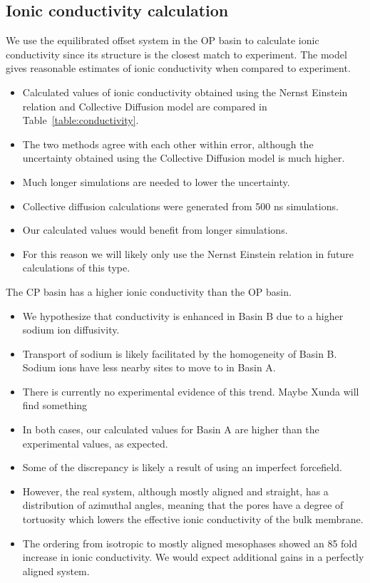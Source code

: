 \documentclass{article}
\begin{document}
  \subsection*{Ionic conductivity calculation}

  We use the equilibrated offset system in the OP basin to calculate ionic 
  conductivity since its structure is the closest match to experiment.
  The model gives reasonable estimates of ionic conductivity when compared to 
  experiment.
  \begin{itemize}
  	\item Calculated values of ionic conductivity obtained using the Nernst 
	Einstein relation and Collective Diffusion model are compared in 
	Table~\ref{table:conductivity}.
	\item The two methods agree with each other within error, although the 
	uncertainty obtained using the Collective Diffusion model is much higher.
	\item Much longer simulations are needed to lower the uncertainty. %
	\item Collective diffusion calculations were generated from 
	500 ns simulations.
	\item Our calculated values would benefit from longer simulations. 
	\item For this reason we will likely only use the Nernst Einstein relation
	in future calculations of this type. 
  \end{itemize}

  The CP basin has a higher ionic conductivity than the OP basin.
  \begin{itemize}
	\item We hypothesize that conductivity is enhanced in Basin B due to a 
	higher sodium ion diffusivity.
	\item Transport of sodium is likely facilitated by the homogeneity of Basin B.
	Sodium ions have less nearby sites to move to in Basin A.
	\item There is currently no experimental evidence of this trend. Maybe Xunda will find something
	\item In both cases, our calculated values for Basin A are higher than the 
	experimental values, as expected. 
	\item Some of the discrepancy is likely a result of using an imperfect forcefield. 
	\item However, the real system, although mostly aligned and straight, has a 
	distribution of azimuthal angles, meaning that the pores have a degree of 
	tortuosity which lowers the effective ionic conductivity of the bulk membrane. 
	\item The ordering from isotropic to mostly aligned mesophases showed an 85 
	fold increase in ionic conductivity. We would expect additional gains in a 
	perfectly aligned system.
  \end{itemize}
	
\end{document}
